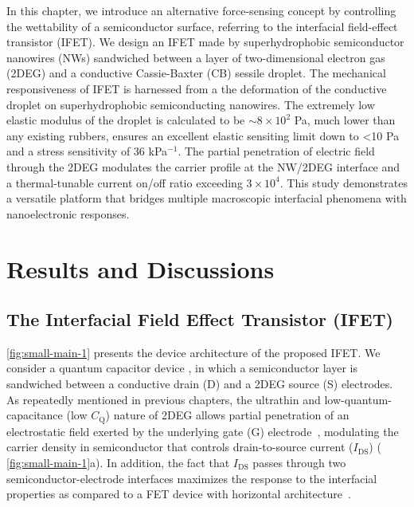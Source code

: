  In this chapter, we introduce an alternative force-sensing concept by
 controlling the wettability of a semiconductor surface, referring to
 the interfacial field-effect transistor (IFET).  We design an IFET
 made by superhydrophobic semiconductor nanowires (NWs) sandwiched
 between a layer of two-dimensional electron gas (2DEG) and a
 conductive Cassie-Baxter (CB) sessile droplet.  The mechanical
 responsiveness of IFET is harnessed from a the deformation of the
 conductive droplet on superhydrophobic semiconducting nanowires. The
 extremely low elastic modulus of the droplet is calculated to be
 $\sim{}8\times{}10^{2}$ Pa, much lower than any existing rubbers,
 ensures an excellent elastic sensiting limit down to \textless{}10 Pa
 and a stress sensitivity of 36 kPa$^{-1}$.
 The partial penetration
 of electric field through the 2DEG modulates the carrier profile at
 the NW/2DEG interface and a thermal-tunable current on/off ratio
 exceeding $3\times{}10^{4}$.
  This study demonstrates a
  versatile platform that bridges multiple macroscopic interfacial
  phenomena with nanoelectronic responses.


\section{Results and Discussions}
\label{sec:small-results-discussions}


\subsection{The Interfacial Field Effect Transistor (IFET)}
\label{sec:small-interf-field-effect}

 \autoref{fig:small-main-1} presents the device architecture of the proposed
IFET. We consider a quantum capacitor device \cite{Luryi_1988_Quantum}, in which
a semiconductor layer is sandwiched between a conductive drain (D) and
a 2DEG source (S) electrodes.
%
As repeatedly mentioned in previous chapters, the ultrathin and
low-quantum-capacitance (low \(C_{\mathrm{Q}}\)) nature of 2DEG allows
partial penetration of an electrostatic field exerted by the
underlying gate (G) electrode~\cite{Shih_2015_PartiallyScreened},
modulating the carrier density in semiconductor that controls
drain-to-source current (\(I_{\mathrm{DS}}\)) (
\autoref{fig:small-main-1}a).
%
In addition, the fact that \(I_{\mathrm{DS}}\) passes through two
semiconductor-electrode interfaces maximizes the response to the
interfacial properties as compared to a FET device with horizontal
architecture~\cite{Ben_Sasson_2014_fet_rev}.

